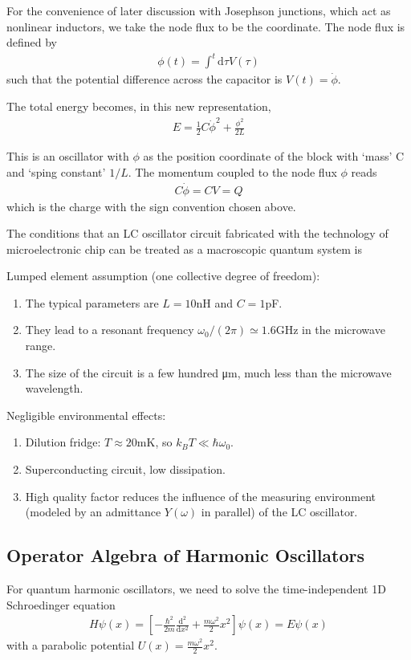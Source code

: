 For the convenience of later discussion with Josephson junctions, which act as nonlinear inductors, we take the node flux to be the coordinate. The node flux is defined by
\begin{align*}
    \phi(t)=\int^t \mathrm{d}\tau V(\tau)
\end{align*}
such that the potential difference across the capacitor is $V(t)=\dot{\phi}$.

The total energy becomes, in this new representation,
\begin{align*}
    E=\frac{1}{2}C\dot{\phi}^2+\frac{\phi^2}{2L}
\end{align*}

This is an oscillator with $\phi$ as the position coordinate of the block with `mass' C and `sping constant' $1/L$. The momentum coupled to the node flux $\phi$ reads
\begin{align*}
    C\dot{\phi}=CV=Q
\end{align*}
which is the charge with the sign convention chosen above.

The conditions that an LC oscillator circuit fabricated with the technology of microelectronic chip can be treated as a macroscopic quantum system is 

Lumped element assumption (one collective degree of freedom):
\begin{enumerate}
    \item The typical parameters are $L = 10$nH and $C = 1$pF.
    \item They lead to a resonant frequency $\omega_0/(2\pi) \simeq  1.6$GHz in the microwave range.
    \item The size of the circuit is a few hundred μm, much less than the microwave wavelength.
\end{enumerate}

Negligible environmental effects:
\begin{enumerate}
    \item Dilution fridge: $T \approx 20 $mK, so $k_B T \ll \hbar \omega_0$.
    \item Superconducting circuit, low dissipation.
    \item High quality factor reduces the influence of the measuring environment (modeled by an admittance $Y (\omega)$ in parallel) of the LC oscillator.
\end{enumerate}



\subsection{Operator Algebra of Harmonic Oscillators}
For quantum harmonic oscillators, we need to solve the time-independent 1D Schroedinger equation
\begin{align*}
    H\psi(x)=\left[ -\frac{\hbar^2}{2m}\frac{\mathrm{d}^2}{\mathrm{d}x^2}+\frac{m\omega^2}{2}x^2 \right]\psi(x)=E\psi(x)
\end{align*}
with a parabolic potential $U(x)=\frac{m\omega^2}{2}x^2$. 


